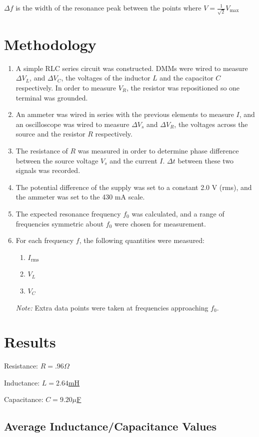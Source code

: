 \documentclass[twocolumn,english]{IEEEtran}
\theoremstyle{plain}
\theoremstyle{plain}
\begin{document}
$\Delta f$ is the width of the resonance peak between the points where $V = \frac{1}{\sqrt{2}}V_{\text{max}}$

\section{Methodology}
\begin{enumerate}
	\item A simple RLC series circuit was constructed. DMMs were wired to measure $\Delta V_L$, and $\Delta V_C$, the voltages of the inductor $L$ and the capacitor $C$ respectively. In order to measure $V_R$, the resistor was repositioned so one terminal was grounded.
	\item An ammeter was wired in series with the previous elements to measure $I$, and an oscilloscope was wired to measure $\Delta V_s$ and $\Delta V_R$, the voltages across the source and the resistor $R$ respectively.
	\item The resistance of $R$ was measured in order to determine phase difference between the source voltage $V_s$ and the current $I$. $\Delta t$ between these two signals was recorded.
	\item The potential difference of the supply was set to a constant 2.0 V (rms), and the ammeter was set to the 430 mA scale.
	\item The expected resonance frequency $f_0$ was calculated, and a range of frequencies symmetric about $f_0$ were chosen for measurement.
	\item For each frequency $f$, the following quantities were measured:
	\begin{enumerate}
		\item $I_{\text{rms}}$
		\item $V_L$
		\item $V_C$
	\end{enumerate}
	\textit{Note:} Extra data points were taken at frequencies approaching $f_0$.
\end{enumerate}

\noindent\hrulefill

\section{Results}
Resistance: \hfill\underline{$R = .96 \Omega$}

Inductance: \hfill\underline{$L = 2.64 $mH}

Capacitance: \hfill\underline{$C = 9.20 \mu$F }
\subsection{Average Inductance/Capacitance Values}
\end{document}
